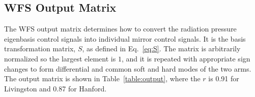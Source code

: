 



\subsection{WFS Output Matrix}
The WFS output matrix determines how to convert the radiation pressure
eigenbasis control signals into individual mirror control signals. It
is the basis transformation matrix, $S$, as defined in
Eq.~\ref{eq:S}. The matrix is arbitrarily normalized so the largest
element is $1$, and it is repeated with appropriate sign changes to
form differential and common soft and hard modes of the two arms. The
output matrix is shown in Table~\ref{table:output}, where the $r$ is
0.91 for Livingston and 0.87 for Hanford. 

